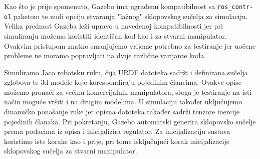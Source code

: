 \documentclass[times, utf8, diplomski, numeric]{fer}
\begin{document}
Kao što je prije spomenuto, Gazebo ima ugrađenu kompatibilnost sa \texttt{ros\_contr- ol} paketom te nudi opciju stvaranja "lažnog" sklopovskog sučelja za simulaciju.
Velika prednost Gazeba leži upravo u navedenoj kompatibilnosti jer pri simuliranju možemo koristiti identičan kod kao i za stvarni manipulator.
Ovakvim pristupom znatno smanjujemo vrijeme potrebno za testiranje jer uočene probleme ne moramo popravljati na dvije različite varijante koda.

Simuliramo Jaco robotsku ruku, čija URDF datoteka sadrži i definirana sučelja zglobova te 3d modele koje korespondiraju pojedinim člancima.
Ovakve opise možemo pronaći za većinu komercijalnih manipulatora, stoga je testiranje na isti način moguće vršiti i na drugim modelima.
U simulaciju također uključujemo dinamičko ponašanje ruke jer opisna datoteka također sadrži tenzore inercije pojedinih članaka.
Pri pokretanju, Gazebo automatski generira sklopovsko sučelje prema podacima iz opisa i inicijalizira regulator.
Za inicijalizaciju sustava koristimo iste korake kao i prije, pri tome isključujući korak inicijalizacije sklopovskog sučelja za stvarni manipulator.
\end{document}
